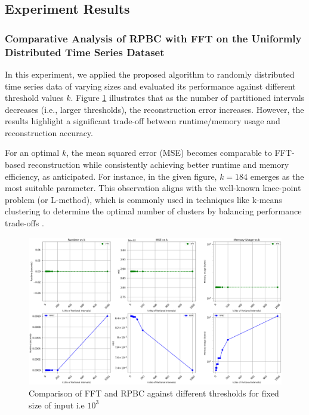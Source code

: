 \documentclass[onecolumn,conference]{IEEEtran}
\begin{document}
\subsection{Experiment Results}
\subsubsection{Comparative Analysis of RPBC with FFT on the Uniformly Distributed Time Series Dataset}
In this experiment, we applied the proposed algorithm to randomly distributed time series data of varying sizes and evaluated its performance against different threshold values $k$. Figure \ref{fig:1_part_a} illustrates that as the number of partitioned intervals decreases (i.e., larger thresholds), the reconstruction error increases. However, the results highlight a significant trade-off between runtime/memory usage and reconstruction accuracy.

For an optimal $k$, the mean squared error (MSE) becomes comparable to FFT-based reconstruction while consistently achieving better runtime and memory efficiency, as anticipated. For instance, in the given figure, 
$k = 184$ emerges as the most suitable parameter. This observation aligns with the well-known knee-point problem (or L-method), which is commonly used in techniques like k-means clustering to determine the optimal number of clusters by balancing performance trade-offs \cite{JSSv061i06}. 
\begin{figure}[!h]
    \centering
    \includegraphics[width=1\linewidth, height=1\linewidth,keepaspectratio]{images/Experiment 1 Part a.png}
    \caption{Comparison of FFT and RPBC against different thresholds for fixed size of input i.e $10^3$}
    \label{fig:1_part_a}
\end{figure}
\end{document}
